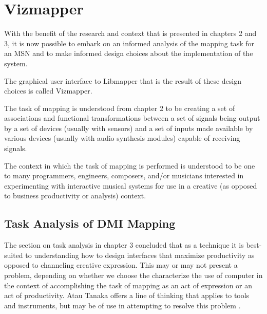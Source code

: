 \resetdatestamp

\chapter{Vizmapper}

With the benefit of the research and context that is presented in chapters 2 and 3, it is now possible to embark on an informed analysis of the mapping task for an MSN and to make informed design choices about the implementation of the system.

The graphical user interface to Libmapper that is the result of these design choices is called Vizmapper.

The task of mapping is understood from chapter 2 to be creating a set of associations and functional transformations between a set of signals being output by a set of devices (usually with sensors) and a set of inputs made available by various devices (usually with audio synthesis modules)  capable of receiving signals.

The context in which the task of mapping is performed is understood to be one to many programmers, engineers, composers, and/or musicians interested in experimenting with interactive musical systems for use in a creative (as opposed to business productivity or analysis) context.

\section{Task Analysis of DMI Mapping}
\begin{comment}
Task analysis and human-computer interaction: approaches, techniques, and levels of analysis - Abe Crystal, Beth Ellington
\end{comment}

The section on task analysis in chapter 3 concluded that as a technique it is best-suited to understanding how to design interfaces that maximize productivity as opposed to channeling creative expression. This may or may not present a problem, depending on whether we choose the characterize the use of computer in the context of accomplishing the task of mapping as an act of expression or an act of productivity. Atau Tanaka offers a line of thinking that applies to tools and instruments, but may be of use in attempting to resolve this problem \cite{tanaka2000}.

